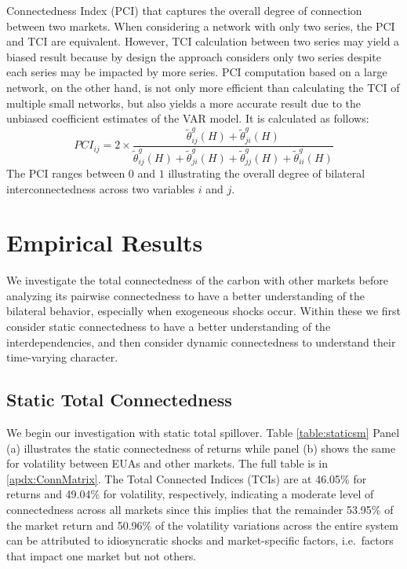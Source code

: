 \documentclass[preprint, 3p,
authoryear]{elsarticle} %
\begin{document}
Connectedness Index (PCI) that captures the overall degree of connection
between two markets. When considering a network with only two series,
the PCI and TCI are equivalent. However, TCI calculation between two
series may yield a biased result because by design the approach
considers only two series despite each series may be impacted by more
series. PCI computation based on a large network, on the other hand, is
not only more efficient than calculating the TCI of multiple small
networks, but also yields a more accurate result due to the unbiased
coefficient estimates of the VAR model. It is calculated as follows:
\begin{equation}
PCI_{ij} = 2 \times \frac{\tilde{\theta}_{ij}^g(H) + \tilde{\theta}_{ji}^g(H)}{\tilde{\theta}_{ij}^g(H)+\tilde{\theta}_{ji}^g(H)+\tilde{\theta}_{jj}^g(H)+\tilde{\theta}_{ii}^g(H)}
\end{equation} The PCI ranges between \(0\) and \(1\) illustrating the
overall degree of bilateral interconnectedness across two variables
\(i\) and \(j\).

\hypertarget{empirical-results}{%
\section{\texorpdfstring{Empirical Results
\label{results}}{Empirical Results }}\label{empirical-results}}

We investigate the total connectedness of the carbon with other markets
before analyzing its pairwise connectedness to have a better
understanding of the bilateral behavior, especially when exogeneous
shocks occur. Within these we first consider static connectedness to
have a better understanding of the interdependencies, and then consider
dynamic connectedness to understand their time-varying character.

\hypertarget{static-total-connectedness}{%
\subsection{Static Total
Connectedness}\label{static-total-connectedness}}

We begin our investigation with static total spillover. Table
\ref{table:staticsm} Panel (a) illustrates the static connectedness of
returns while panel (b) shows the same for volatility between EUAs and
other markets. The full table is in \ref{apdx:ConnMatrix}. The Total
Connected Indices (TCIs) are at 46.05\% for returns and 49.04\% for
volatility, respectively, indicating a moderate level of connectedness
across all markets since this implies that the remainder 53.95\% of the
market return and 50.96\% of the volatility variations across the entire
system can be attributed to idiosyncratic shocks and market-specific
factors, i.e.~factors that impact one market but not others.
\end{document}
